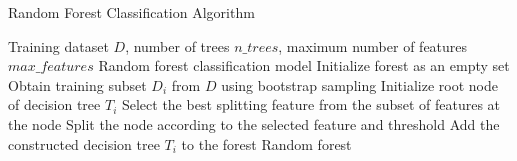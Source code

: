 \documentclass{article}
\begin{document}
	
	\begin{algorithm}
		\caption{Random Forest Classification Algorithm}
		\begin{algorithmic}[1]
			\Require Training dataset $D$, number of trees $n\_trees$, maximum number of features $max\_features$
			\Ensure Random forest classification model
			\State Initialize forest as an empty set
			\State Obtain training subset $D_i$ from $D$ using bootstrap sampling
			\State Initialize root node of decision tree $T_i$
			\State Select the best splitting feature from the subset of features at the node
			\State Split the node according to the selected feature and threshold
			\EndWhile
			\State Add the constructed decision tree $T_i$ to the forest
			\EndFor
			\State \Return Random forest
		\end{algorithmic}
	\end{algorithm}
	
\end{document}
